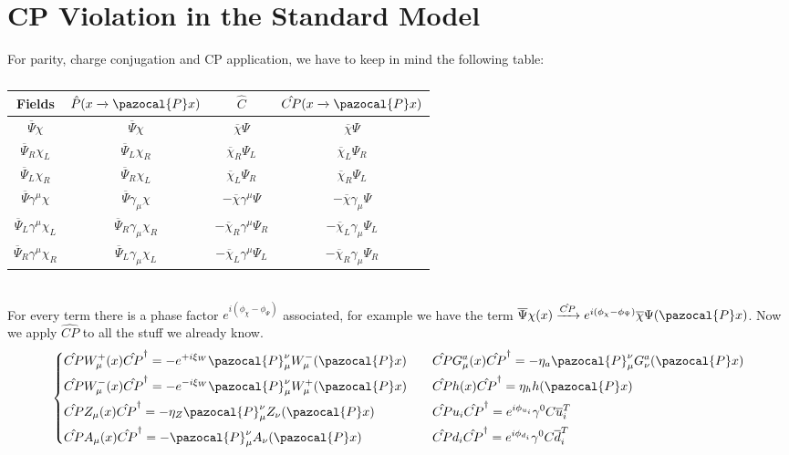 \documentclass[../main.tex]{subfiles}
\begin{document}
\section{CP Violation in the Standard Model}
For parity, charge conjugation and CP application, we have to keep in mind the following table:
\begin{table}[h]
    \centering
    {\renewcommand{\arraystretch}{1}
    \begin{tabular}{c|c|c|c}
    \hline
    \rowcolor{gray!45}Fields & $\hat{P}(x\xrightarrow[]{}\pazocal{P}x)$ & $\hat{C}$ & $\hat{CP}(x\xrightarrow[]{}\pazocal{P}x)$\\
    \hline
    $\overline{\Psi}\chi$ & $\overline{\Psi}\chi$ & $\overline{\chi}\Psi$ & $\overline{\chi}\Psi$\\
    $\overline{\Psi}_R\chi_L$ & $\overline{\Psi}_L\chi_R$ & $\overline{\chi}_R\Psi_L$ & $\overline{\chi}_L\Psi_R$\\
    $\overline{\Psi}_L\chi_R$ & $\overline{\Psi}_R\chi_L$ & $\overline{\chi}_L\Psi_R$ & $\overline{\chi}_R\Psi_L$\\
    $\overline{\Psi}\gamma^\mu\chi$ & $\overline{\Psi}\gamma_\mu\chi$ & $-\overline{\chi}\gamma^\mu\Psi$ & $-\overline{\chi}\gamma_\mu\Psi$ \\
    $\overline{\Psi}_L\gamma^\mu\chi_L$ & $\overline{\Psi}_R\gamma_\mu\chi_R$ & $-\overline{\chi}_R\gamma^\mu\Psi_R$ & $-\overline{\chi}_L\gamma_\mu\Psi_L$\\
    $\overline{\Psi}_R\gamma^\mu\chi_R$ & $\overline{\Psi}_L\gamma_\mu\chi_L$ & $-\overline{\chi}_L\gamma^\mu\Psi_L$ & $-\overline{\chi}_R\gamma_\mu\Psi_R$\\
    \hline
    \end{tabular}
    }
    \caption*{}
\end{table}\\
For every term there is a phase factor $e^{i(\phi_\chi-\phi_\Psi)}$ associated, for example we have the term $\overline{\Psi}\chi(x)\xrightarrow[]{\hat{CP}}e^{i(\phi_\chi-\phi_\Psi)}\overline{\chi}\Psi(\pazocal{P}x)$. Now we apply $\hat{CP}$ to all the stuff we already know.
\[
\left\{
\begin{aligned}
&\hat{CP}W_\mu^+(x)\hat{CP}^\dagger=-e^{+i\xi_W}\pazocal{P}_\mu^\nu W_\mu^-(\pazocal{P}x) \quad 
&&\hat{CP}G_\mu^a(x)\hat{CP}^\dagger=-\eta_a\pazocal{P}_\mu^\nu G_\nu^a(\pazocal{P}x)\\   
&\hat{CP}W_\mu^-(x)\hat{CP}^\dagger=-e^{-i\xi_W}\pazocal{P}_\mu^\nu W_\mu^+(\pazocal{P}x) \quad &&\hat{CP}h(x)\hat{CP}^\dagger=\eta_h h(\pazocal{P}x)\\
&\hat{CP}Z_\mu(x)\hat{CP}^\dagger=-\eta_Z\pazocal{P}_\mu^\nu Z_\nu(\pazocal{P}x) \quad &&\hat{CP}u_i\hat{CP}^\dagger=e^{i\phi_{u_i}}\gamma^0C\overline{u}_i^T\\
&\hat{CP}A_\mu(x)\hat{CP}^\dagger=-\pazocal{P}_\mu^\nu A_\nu(\pazocal{P}x) \quad &&\hat{CP}d_i\hat{CP}^\dagger=e^{i\phi_{d_i}}\gamma^0C\overline{d}_i^T
\end{aligned}
\right.
\]
\end{document}
